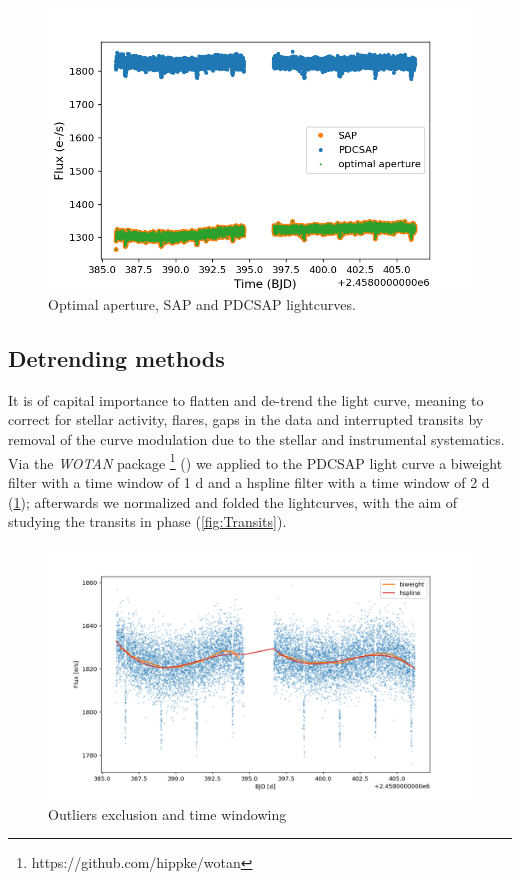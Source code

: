\documentclass[a4paper,11pt,twocolumn]{article}
\begin{document}
\begin{figure}
    \centering
    \includegraphics[scale=0.3, angle=0]{../pictures/tess/lightcurve.png}
    \caption{Optimal aperture, SAP and PDCSAP lightcurves.}
\end{figure}



\subsection{Detrending methods}

It is of capital importance to flatten and de-trend the light curve, meaning to correct for stellar activity, 
flares, gaps in the data and interrupted transits by removal of the curve modulation due to the stellar and instrumental systematics.
Via the \textit{WOTAN} package \footnote{https://github.com/hippke/wotan} (\cite{Hippke1}) we applied to the 
PDCSAP light curve a biweight filter with a time window of 1 d and a hspline filter with a time window of 2 d 
(\ref{fig:filters}); afterwards we normalized and folded the lightcurves, with the aim of studying the transits in phase (\ref{fig:Transits}).


\begin{figure}
    \includegraphics[scale=0.18, angle=0]{../pictures/tess/filters.png}
    \caption{Outliers exclusion and time windowing}
   \label{fig:filters}
\end{figure}
\end{document}
